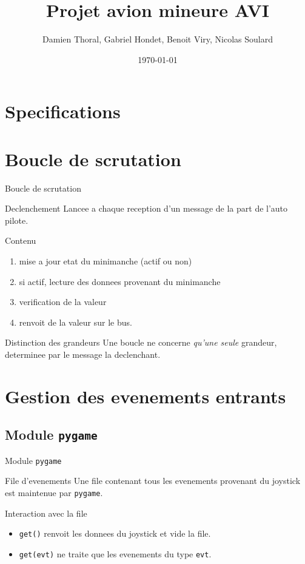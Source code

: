 \documentclass[footheight=2em]{beamer}
\title{Projet avion mineure AVI}
\author{Damien Thoral, Gabriel Hondet, Benoit Viry, Nicolas Soulard}
\date{\today}
\begin{document}
\frame{\titlepage}


\section{Specifications}

\section{Boucle de scrutation}
\begin{frame}[t]{Boucle de scrutation}
  \begin{block}{Declenchement}
    Lancee a chaque reception d'un message de la part de l'auto pilote.
  \end{block}

  \begin{block}{Contenu}
    \begin{enumerate}
      \item mise a jour etat du minimanche (actif ou non)
      \item si actif, lecture des donnees provenant du minimanche
      \item verification de la valeur
      \item renvoit de la valeur sur le bus.
    \end{enumerate}
  \end{block}

  \begin{block}{Distinction des grandeurs}
    Une boucle ne concerne \emph{qu'une seule} grandeur, determinee par le
    message la declenchant.
  \end{block}
\end{frame}

\section{Gestion des evenements entrants}
\subsection{Module \texttt{pygame}}
\begin{frame}[t]{Module \texttt{pygame}}
  \begin{block}{File d'evenements}
    Une file contenant tous les evenements provenant du joystick est maintenue
    par \texttt{pygame}.
  \end{block}
  \begin{block}{Interaction avec la file}
    \begin{itemize}
      \item \texttt{get()} renvoit les donnees du joystick et vide la file.
      \item \texttt{get(evt)} ne traite que les evenements du type \texttt{evt}.
    \end{itemize}
  \end{block}
\end{frame}
\end{document}
